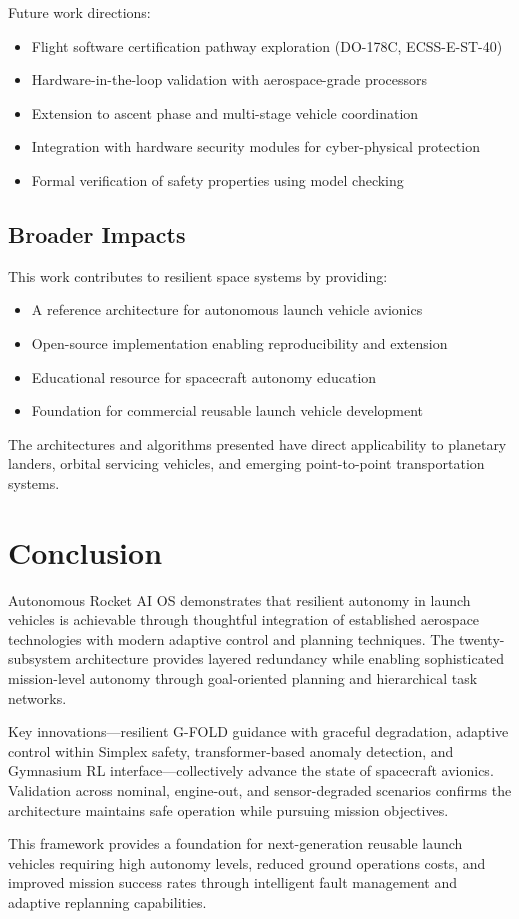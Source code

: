 \documentclass[10pt, conference, compsocconf]{IEEEtran}
\begin{document}
Future work directions:
\begin{itemize}
\item Flight software certification pathway exploration (DO-178C, ECSS-E-ST-40)
\item Hardware-in-the-loop validation with aerospace-grade processors
\item Extension to ascent phase and multi-stage vehicle coordination
\item Integration with hardware security modules for cyber-physical protection
\item Formal verification of safety properties using model checking
\end{itemize}

\subsection{Broader Impacts}

This work contributes to resilient space systems by providing:
\begin{itemize}
\item A reference architecture for autonomous launch vehicle avionics
\item Open-source implementation enabling reproducibility and extension
\item Educational resource for spacecraft autonomy education
\item Foundation for commercial reusable launch vehicle development
\end{itemize}

The architectures and algorithms presented have direct applicability to planetary landers, orbital servicing vehicles, and emerging point-to-point transportation systems.

\section{Conclusion}
\label{sec:conclusion}

Autonomous Rocket AI OS demonstrates that resilient autonomy in launch vehicles is achievable through thoughtful integration of established aerospace technologies with modern adaptive control and planning techniques. The twenty-subsystem architecture provides layered redundancy while enabling sophisticated mission-level autonomy through goal-oriented planning and hierarchical task networks.

Key innovations—resilient G-FOLD guidance with graceful degradation, adaptive control within Simplex safety, transformer-based anomaly detection, and Gymnasium RL interface—collectively advance the state of spacecraft avionics. Validation across nominal, engine-out, and sensor-degraded scenarios confirms the architecture maintains safe operation while pursuing mission objectives.

This framework provides a foundation for next-generation reusable launch vehicles requiring high autonomy levels, reduced ground operations costs, and improved mission success rates through intelligent fault management and adaptive replanning capabilities.





\end{document}
